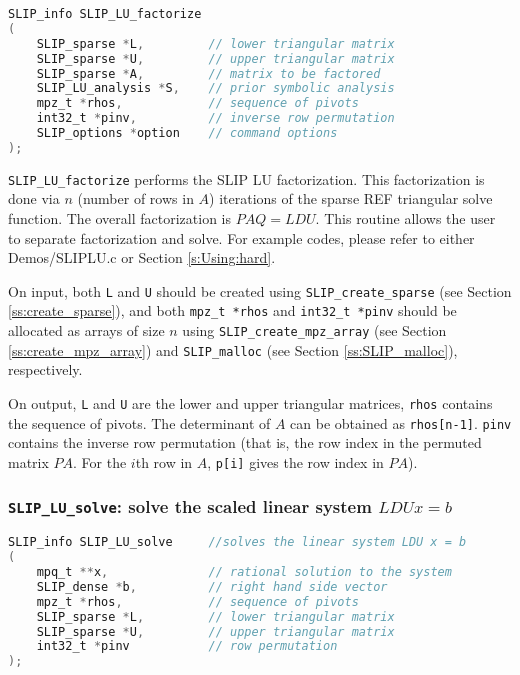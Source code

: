 \documentclass[12pt]{article}
\theoremstyle{definition}
\begin{document}
\begin{lstlisting}[language=C,frame=single]
SLIP_info SLIP_LU_factorize
(
    SLIP_sparse *L,         // lower triangular matrix
    SLIP_sparse *U,         // upper triangular matrix
    SLIP_sparse *A,         // matrix to be factored
    SLIP_LU_analysis *S,    // prior symbolic analysis
    mpz_t *rhos,            // sequence of pivots
    int32_t *pinv,          // inverse row permutation
    SLIP_options *option    // command options
);
\end{lstlisting}

\verb|SLIP_LU_factorize| performs the SLIP LU factorization. This factorization is done via $n$ (number of rows in $A$) iterations of the sparse REF triangular solve function. The overall factorization is $PAQ = LDU$.  This routine allows the user to separate factorization and solve. For example codes, please refer to either Demos/SLIPLU.c or Section \ref{s:Using:hard}.

On input, both \verb|L| and \verb|U| should be created using \verb|SLIP_create_sparse| (see Section \ref{ss:create_sparse}), and both \verb|mpz_t *rhos| and \verb|int32_t *pinv| should be allocated as arrays of size $n$ using \verb|SLIP_create_mpz_array| (see Section \ref{ss:create_mpz_array}) and \verb|SLIP_malloc| (see Section \ref{ss:SLIP_malloc}), respectively.

On output, \verb|L| and \verb|U| are the lower and upper triangular matrices, \verb|rhos| contains the sequence of pivots. The determinant of $A$ can be obtained as \verb|rhos[n-1]|. \verb|pinv| contains the inverse row permutation (that is, the row index in the permuted matrix $PA$. For the $i$th row in $A$, \verb|p[i]| gives the row index in $PA$).


\cprotect\subsubsection{\verb|SLIP_LU_solve|: solve the scaled linear system $LDUx=b$}\label{ss:SLIP_LU_solve}


\begin{lstlisting}[language=C,frame=single]
SLIP_info SLIP_LU_solve     //solves the linear system LDU x = b
(
    mpq_t **x,              // rational solution to the system
    SLIP_dense *b,          // right hand side vector
    mpz_t *rhos,            // sequence of pivots
    SLIP_sparse *L,         // lower triangular matrix
    SLIP_sparse *U,         // upper triangular matrix
    int32_t *pinv           // row permutation
);
\end{lstlisting}
\end{document}
